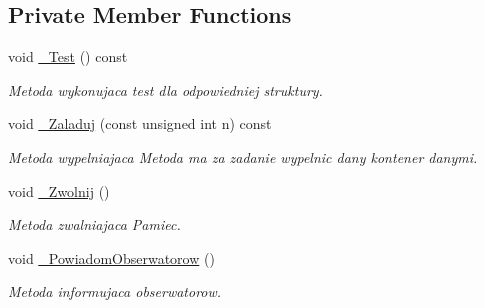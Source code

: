 \subsection*{Private Member Functions}
\begin{DoxyCompactItemize}
\item 
void \hyperlink{class_struktury_benchmark_a437a5c4b2a1811f3067d1117ac2c2c0e}{\-\_\-\-Test} () const 
\begin{DoxyCompactList}\small\item\em Metoda wykonujaca test dla odpowiedniej struktury. \end{DoxyCompactList}\item 
void \hyperlink{class_struktury_benchmark_a263ee44187c7efb212d031e97cd39bb1}{\-\_\-\-Zaladuj} (const unsigned int n) const 
\begin{DoxyCompactList}\small\item\em Metoda wypelniajaca Metoda ma za zadanie wypelnic dany kontener danymi. \end{DoxyCompactList}\item 
void \hyperlink{class_struktury_benchmark_a81596424109f9dbe028c3ad3496d04a1}{\-\_\-\-Zwolnij} ()
\begin{DoxyCompactList}\small\item\em Metoda zwalniajaca Pamiec. \end{DoxyCompactList}\item 
void \hyperlink{class_struktury_benchmark_af5aa09efcf9a1727e0868930b97ede49}{\-\_\-\-Powiadom\-Obserwatorow} ()
\begin{DoxyCompactList}\small\item\em Metoda informujaca obserwatorow. \end{DoxyCompactList}\end{DoxyCompactItemize}
